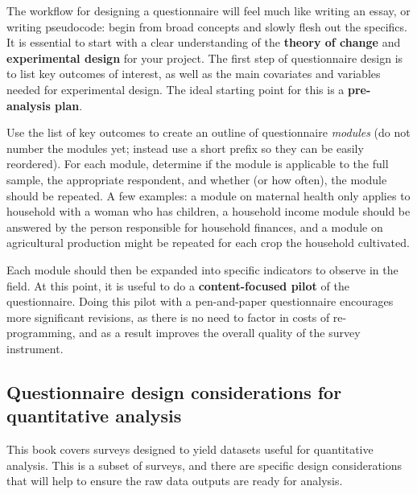 The workflow for designing a questionnaire will feel much like writing an essay, or writing pseudocode: begin from broad concepts and slowly flesh out the specifics. It is essential to start with a clear understanding of the 
\textbf{theory of change}  and \textbf{experimental design} for your project.
The first step of questionnaire design is to list key outcomes of interest, as well as the main covariates and variables needed for experimental design. 
The ideal starting point for this is a \textbf{pre-analysis plan}. 

Use the list of key outcomes to create an outline of questionnaire \textit{modules} (do not number the modules yet; instead use a short prefix so they can be easily reordered). For each module, determine if the module is applicable to the full sample, the appropriate respondent, and whether (or how often), the module should be repeated. A few examples: a module on maternal health only applies to household with a woman who has children, a household income module should be answered by the person responsible for household finances, and a module on agricultural production might be repeated for each crop the household cultivated. 

Each module should then be expanded into specific indicators to observe in the field. 
At this point, it is useful to do a  \textbf{content-focused pilot}  of the questionnaire. 
Doing this pilot with a pen-and-paper questionnaire encourages more significant revisions, as there is no need to factor in costs of re-programming, and as a result improves the overall quality of the survey instrument. 

\subsection{Questionnaire design considerations for quantitative analysis}
This book covers surveys designed to yield datasets useful for quantitative analysis. This is a subset of surveys, and there are specific design considerations that will help to ensure the raw data outputs are ready for analysis. 

